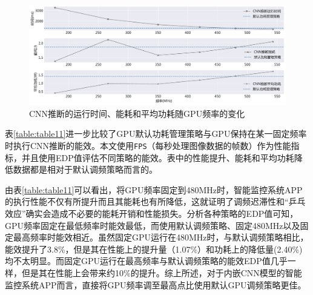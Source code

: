 \begin{figure}[htbp]
    \centering
    \includegraphics[width=1.0\textwidth]{figures/system_explore.pdf}
    \caption{CNN推断的运行时间、能耗和平均功耗随GPU频率的变化}\label{figure:figure38}
\end{figure}

表\ref{table:table11}进一步比较了GPU默认功耗管理策略与GPU保持在某一固定频率时执行CNN推断的能效。本文使用\texttt{FPS}（每秒处理图像数据的帧数）作为性能指标，并且使用EDP值评估不同策略的能效。表中的性能提升、能耗和平均功耗降低数据都是相对于默认调频策略而言的。

\begin{table}[htbp]
  \centering
  \caption{智能监控系统APP在不同调频策略下的能效}
  \label{table:table11}
\end{table}

由表\ref{table:table11}可以看出，将GPU频率固定到480MHz时，智能监控系统APP的执行性能不仅有所提升而且其能耗也有所降低，这就证明了调频迟滞性和“乒乓效应”确实会造成不必要的能耗开销和性能损失。分析各种策略的EDP值可知，GPU频率固定在最低频率时能效最低，而使用默认调频策略、固定480MHz以及固定最高频率时能效相近。虽然固定GPU运行在480MHz时，与默认调频策略相比，能效提升了3.8\%，但是其在性能上的提升量（1.07\%）和功耗上的降低量(2.40\%)均不太明显。而固定GPU运行在最高频率与默认调频策略的能效EDP值几乎一样，但是其在性能上会带来约10\%的提升。综上所述，对于内嵌CNN模型的智能监控系统APP而言，直接将GPU频率调至最高点比使用默认GPU调频策略更佳。

